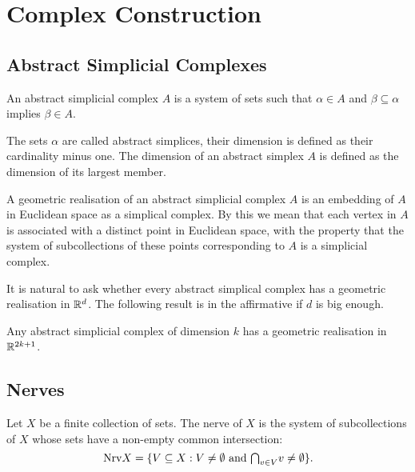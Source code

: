 \section{Complex Construction}


\subsection{Abstract Simplicial Complexes}

\begin{definition}
An abstract simplicial complex $A$ is a system of sets such that $\alpha \in A$ and $\beta \subseteq \alpha$ implies $\beta \in A$.
\end{definition}

The sets $\alpha$ are called abstract simplices, their dimension is defined as their cardinality minus one. The dimension of an abstract simplex $A$ is defined as the dimension of its largest member.

\begin{definition}
A geometric realisation of an abstract simplicial complex $A$ is an embedding of $A$ in Euclidean space as a simplical complex. By this we mean that each vertex in $A$ is associated with a distinct point in Euclidean space, with the property that the system of subcollections of these points corresponding to $A$ is a simplicial complex.
\end{definition}

It is natural to ask whether every abstract simplical complex has a geometric realisation in $\mathbb{R}^d$. The following result is in the affirmative if $d$ is big enough.

\begin{theorem}
Any abstract simplicial complex of dimension $k$ has a geometric realisation in $\mathbb{R}^{2k+1}$.
\end{theorem}


\subsection{Nerves}

\begin{definition}
Let $X$ be a finite collection of sets. The nerve of $X$ is the system of subcollections of $X$ whose sets have a non-empty common intersection:
$$
\nrv X = \{V \subseteq X : V \not= \emptyset \text{ and } \mathsmaller{\bigcap}_{v \in V} v \not= \emptyset\}.
$$
\end{definition}

